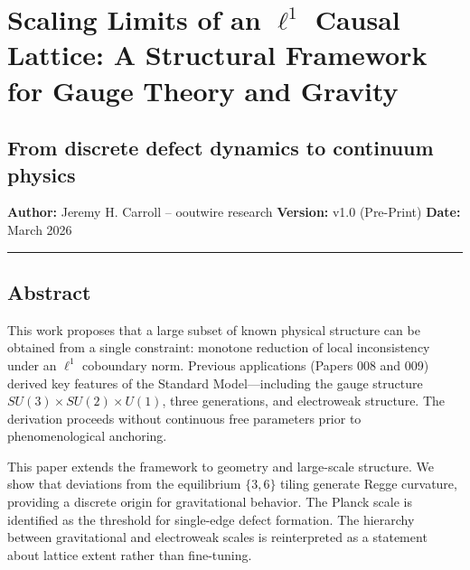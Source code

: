 \documentclass[
]{article}
\author{}
\date{}
\begin{document}
\hypertarget{scaling-limits-of-an-ell1-causal-lattice-a-structural-framework-for-gauge-theory-and-gravity}{%
\section{\texorpdfstring{Scaling Limits of an \(\ell^1\) Causal Lattice:
A Structural Framework for Gauge Theory and
Gravity}{Scaling Limits of an \textbackslash ell\^{}1 Causal Lattice: A Structural Framework for Gauge Theory and Gravity}}\label{scaling-limits-of-an-ell1-causal-lattice-a-structural-framework-for-gauge-theory-and-gravity}}

\hypertarget{from-discrete-defect-dynamics-to-continuum-physics}{%
\subsection{From discrete defect dynamics to continuum
physics}\label{from-discrete-defect-dynamics-to-continuum-physics}}

\textbf{Author:} Jeremy H. Carroll -- ooutwire research
\textbf{Version:} v1.0 (Pre-Print) \textbf{Date:} March 2026

\begin{center}\rule{0.5\linewidth}{0.5pt}\end{center}

\hypertarget{abstract}{%
\subsection{Abstract}\label{abstract}}

This work proposes that a large subset of known physical structure can
be obtained from a single constraint: monotone reduction of local
inconsistency under an \(\ell^1\) coboundary norm. Previous applications
(Papers 008 and 009) derived key features of the Standard
Model---including the gauge structure
\(SU(3) \times SU(2) \times U(1)\), three generations, and electroweak
structure. The derivation proceeds without continuous free parameters
prior to phenomenological anchoring.

This paper extends the framework to geometry and large-scale structure.
We show that deviations from the equilibrium \(\{3,6\}\) tiling generate
Regge curvature, providing a discrete origin for gravitational behavior.
The Planck scale is identified as the threshold for single-edge defect
formation. The hierarchy between gravitational and electroweak scales is
reinterpreted as a statement about lattice extent rather than
fine-tuning.
\end{document}
